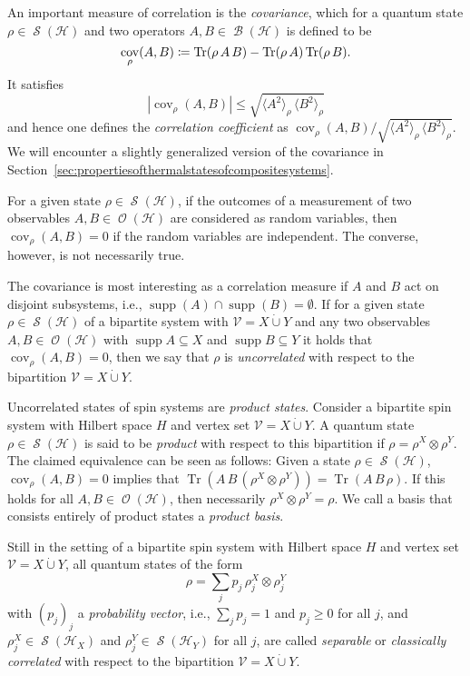 \documentclass[a4paper,12pt,listof=totoc,index=totoc,bibliography=totoc,headsepline=false,headings=normal,BCOR16.153846mm,DIV12,headinclude,twoside,cleardoublepage=empty,numbers=noenddot,final]{scrreprt}
\theoremstyle{mystyle}
\numberwithin{equation}{section}
\numberwithin{figure}{section}
\numberwithin{lemma}{section}
\numberwithin{theorem}{section}
\numberwithin{corollary}{section}
\numberwithin{definition}{section}
\numberwithin{conjecture}{section}
\numberwithin{observation}{section}
\newcommand{\+}{\mkern2mu}
\newcommand{\coloneqq}{\mathrel{\vcentcolon\mkern-1.2mu=}} %
\newcommand{\dunion}{\mathbin{\dot{\cup}}}
\renewcommand{\H}{H}
\newcommand{\Vset}{\mathcal{V}}
\newcommand{\ex}[2]{\langle #1 \rangle_{#2}}
\DeclareMathOperator{\1}{\mathds{1}}
\DeclareMathOperator{\Bop}{\mathcal{B}}
\DeclareMathOperator{\Obs}{\mathcal{O}}
\DeclareMathOperator{\Qst}{\mathcal{S}}
\DeclareMathOperator{\Tr}{Tr}
\DeclareMathOperator{\supp}{supp}
\DeclareMathOperator{\cov}{cov}
\newcommand{\mc}[1]{\mathcal{#1}}
\newcommand{\mcH}{\mc{H}}
\begin{document}
An important measure of correlation is the \emph{covariance}, which for a quantum state $\rho \in \Qst(\mcH)$ and two operators $A,B \in \Bop(\mcH)$ is defined to be
\begin{equation} \label{eq:covariance}
 \cov_\rho(A,B) \coloneqq \Tr(\rho\,A\,B) - \Tr(\rho\, A) \Tr(\rho \, B) .
\end{equation}
It satisfies
\begin{equation}
 |\cov_\rho(A,B)| \leq \sqrt{\ex{A^2}\rho \, \ex{B^2}\rho} 
\end{equation}
and hence one defines the \emph{correlation coefficient} as $\cov_\rho(A,B) / \sqrt{\ex{A^2}\rho \, \ex{B^2}\rho}$.
We will encounter a slightly generalized version of the covariance in Section~\ref{sec:propertiesofthermalstatesofcompositesystems}.

For a given state $\rho \in \Qst(\mcH)$, if the outcomes of a measurement of two observables $A,B \in \Obs(\mcH)$ are considered as random variables, then $\cov_\rho(A,B) = 0$ if the random variables are independent.
The converse, however, is not necessarily true. 

The covariance is most interesting as a correlation measure if $A$ and $B$ act on disjoint subsystems, i.e., $\supp(A) \cap \supp(B) = \emptyset$.
If for a given state $\rho \in \Qst(\mcH)$ of a bipartite system with $\Vset = X \dunion Y$ and any two observables $A,B \in \Obs(\mcH)$ with $\supp A \subseteq X$ and $\supp B \subseteq Y$ it holds that $\cov_\rho(A,B) = 0$, then we say that $\rho$ is \emph{uncorrelated} with respect to the bipartition $\Vset = X \dunion Y$.

Uncorrelated states of spin systems are \emph{product states}.
Consider a bipartite spin system with Hilbert space $\H$ and vertex set $\Vset = X \dunion Y$.
A quantum state $\rho \in \Qst(\mcH)$ is said to be \emph{product} with respect to this bipartition if $\rho = \rho^X \otimes \rho^Y$.
The claimed equivalence can be seen as follows:
Given a state $\rho \in \Qst(\mcH)$, $\cov_\rho(A,B) = 0$ implies that $\Tr(A\,B\, (\rho^X \otimes \rho^Y) ) = \Tr(A\,B\,\rho).$ If this holds for all $A,B \in \Obs(\mcH)$, then necessarily $\rho^X \otimes \rho^Y = \rho$.
We call a basis that consists entirely of product states a \emph{product basis}.

Still in the setting of a bipartite spin system with Hilbert space $\H$ and vertex set $\Vset = X \dunion Y$, all quantum states of the form
\begin{equation}
  \rho = \sum_j p_j\, \rho_j^X \otimes \rho_j^Y
\end{equation}
with $(p_j)_j$ a \emph{probability vector}, i.e., $\sum_j p_j = 1$ and $p_j \geq 0$ for all $j$, and $\rho_j^X \in \Qst(\mcH_X)$ and $\rho_j^Y \in \Qst(\mcH_Y)$ for all $j$, are called \emph{separable} or \emph{classically correlated} with respect to the bipartition $\Vset = X \dunion Y$.
\end{document}
